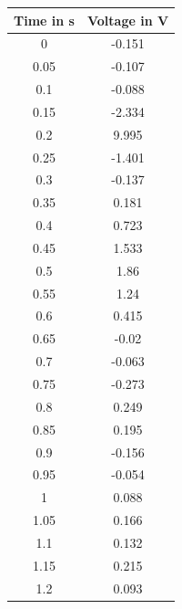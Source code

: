 \newpage
\begin{minipage}{0.5\textwidth}
    \center
        \begin{tabular}{|c|c|}
            \hline
            Time in s & Voltage in V \\
            \hline
            0 & -0.151\\
            \hline
            0.05 & -0.107\\
            \hline
            0.1	& -0.088\\
            \hline
            0.15 & -2.334\\
            \hline
            0.2	& 9.995\\
            \hline
            0.25 & -1.401\\
            \hline
            0.3	& -0.137\\
            \hline
            0.35 & 0.181\\
            \hline
            0.4 & 0.723\\
            \hline
            0.45 & 1.533\\
            \hline
            0.5	& 1.86\\
            \hline
            0.55 & 1.24\\
            \hline
            0.6	& 0.415\\
            \hline
            0.65 & -0.02\\
            \hline
            0.7	& -0.063\\
            \hline
            0.75 & -0.273\\
            \hline
            0.8	& 0.249\\
            \hline
            0.85 & 0.195\\
            \hline
            0.9	& -0.156\\
            \hline
            0.95 & -0.054\\
            \hline
            1 & 0.088\\
            \hline
            1.05 & 0.166\\
            \hline
            1.1	& 0.132\\
            \hline
            1.15 & 0.215\\
            \hline
            1.2	& 0.093\\
            \hline
        \end{tabular}
        \label{Tab:Values of Voltage Graph 2}
\end{minipage}
